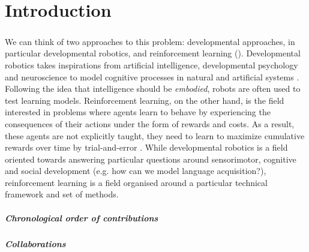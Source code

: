 
\chapter{Introduction}


\paragraph{}We can think of two approaches to this problem: developmental approaches, in particular developmental robotics, and reinforcement learning (\rl). Developmental robotics takes inspirations from artificial intelligence, developmental psychology and neuroscience to model cognitive processes in natural and artificial systems \citep{asada2009cognitive,cangelosi2015developmental}. Following the idea that intelligence should be \textit{embodied}, robots are often used to test learning models. Reinforcement learning, on the other hand, is the field interested in problems where agents learn to behave by experiencing the consequences of their actions under the form of rewards and costs. As a result, these agents are not explicitly taught, they need to learn to maximize cumulative rewards over time by trial-and-error \citep{sutton2018reinforcement}. While developmental robotics is a field oriented towards answering particular questions around sensorimotor, cognitive and social development (e.g. how can we model language acquisition?), reinforcement learning is a field organised around a particular technical framework and set of methods.

\clearpage

\paragraph{Chronological order of contributions}

\paragraph{Collaborations}



